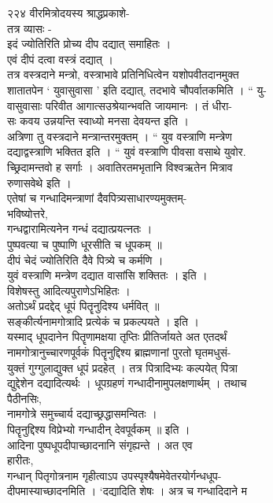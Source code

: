 \documentclass[11pt, openany]{book}
\begin{document}
{{{{{{{{{{{{{{{{{{{२२४ वीरमित्रोदयस्य श्राद्धप्रकाशे-}{\\
तत्र व्यासः -\\
इदं ज्योतिरिति प्रोच्य दीप दद्यात् समाहितः ।\\
एवं दीपं दत्वा वस्त्रं दद्यात् ।\\
तत्र वस्त्रदाने मन्त्रो, वस्त्राभावे प्रतिनिधित्वेन यशोपवीतदानमुक्त\\
शातातपेन ` युवासुवासा ' इति दद्यात्, तदभावे चौपर्वातकमिति । `` यु-\\
वासुवासाः परिवीत आगात्सउश्रेयान्भवति जायमानः । तं धीरा-\\
सः कवय उन्नयन्ति स्वाध्यो मनसा देवयन्त इति ।\\
अत्रिणा तु वस्त्रदाने मन्त्रान्तरमुक्तम् । `` युव वस्त्राणि मन्त्रेण\\
दद्याद्वस्त्राणि भक्तित इति । `` युवं वस्त्राणि पीवसा वसाथे युवोर.\\
च्छ्रिदामन्तवो ह सर्गाः । अवातिरतमभृतानि विश्वऋतेन मित्राव\\
रुणासवेथे इति ।\\
एतेषां च गन्धादिमन्त्राणां दैवपित्र्यसाधारण्यमुक्तम्-\\
भविष्योत्तरे,\\
गन्धद्वारामित्यनेन गन्धं दद्यात्प्रयत्नतः ।\\
पुष्पवत्या च पुष्पाणि धूरसीति च धूपकम् ॥\\
दीपं चेदं ज्योतिरिति दैवे पित्र्ये च कर्मणि ।\\
युवं वस्त्राणि मन्त्रेण दद्यात वासांसि शक्तितः । इति ।\\
विशेषस्तु आदित्यपुराणेऽभिहितः ।\\
अतोऽर्थं प्रदद्देद् धूपं पितॄनुदिश्य धर्मवित् ॥\\
सङ्कीर्त्यनामगोत्रादि प्रत्येकं च प्रकल्पयते । इति ।\\
यस्माद् धूपदानेन पि}{तॄ}{णामक्षया तृप्तिः प्रीतिर्जायते अत एतदर्थं\\
नामगोत्रानुच्चारणपूर्वकं पितॄनुद्दिश्य ब्राह्मणानां पुरतो घृतमधुसं-\\
युक्तं गुग्गुलाद्युक्त धूपं प्रदहेत् । तत्र पित्रादिभ्यः कल्पयेत्
पित्रा\\
द्युद्देशेन दद्यादित्यर्थः । धूपग्रहणं गन्धादीनामुपलक्षणार्थम् । तथाच\\
पैठीनसिः,\\
नामगोत्रे समुच्चार्य दद्याच्छ्रद्धासमन्वितः ।\\
पितॄनुद्दिश्य विप्रेभ्यो गन्धादीन् देवपूर्वकम् ॥ इति ।\\
आदिना पुष्पधूपदीपाच्छादनानि संगृह्यन्ते । अत एव\\
हारीतः,\\
गन्धान् पितृगोत्रनाम गृहीत्वाऽप उपस्पृश्यैषमेवेतरयोर्गन्धधूप-\\
दीपमास्याच्छादनमिति । `दद्यादिति शेषः । अत्र च गन्धादिदाने म\\


}}}}}}}}}}}}}}}}}}}
\end{document}
